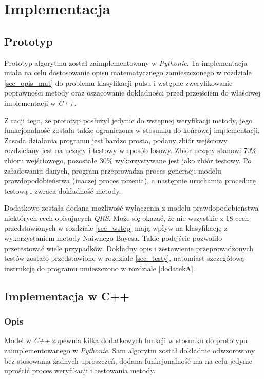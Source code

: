 \section{Implementacja}
\label{sec_implementacja}

\subsection{Prototyp}
\label{subsec_prototyp}

Prototyp algorytmu został zaimplementowany w \textit{Pythonie}. Ta implementacja miała na celu dostosowanie opisu matematycznego zamieszczonego w rozdziale \ref{sec_opis_mat} do problemu klasyfikacji pulsu i wstępne zweryfikowanie poprawności metody oraz oszacowanie dokładności przed przejściem do właściwej implementacji w \textit{C++}.

Z racji tego, że prototyp posłużył jedynie do wstępnej weryfikacji metody, jego funkcjonalność została także ograniczona w stosunku do końcowej implementacji. Zasada działania programu jest bardzo prosta, podany zbiór wejściowy rozdzielany jest na uczący i testowy w sposób losowy. Zbiór uczący stanowi 70\% zbioru wejściowego, pozostałe 30\% wykorzystywane jest jako zbiór testowy. Po załadowaniu danych, program przeprowadza proces generacji modelu prawdopodobieństwa (inaczej proces uczenia), a następnie uruchamia procedurę testową i zwraca dokładność metody.

Dodatkowo została dodana możliwość wyłączenia z modelu prawdopodobieństwa niektórych cech opisujących \textit{QRS}. Może się okazać, że nie wszystkie z 18 cech przedstawionych w rozdziale \ref{sec_wstep} mają wpływ na klasyfikację z wykorzystaniem metody Naiwnego Bayesa. Takie podejście pozwoliło przetestować wiele przypadków. Dokładny opis i zestawienie przeprowadzonych testów zostało przedstawione w rozdziale \ref{sec_testy}, natomiast szczegółową instrukcję do programu umieszczono w rozdziale \ref{dodatekA}.

\subsection{Implementacja w C++}
\label{subsec_implementacja_cpp}

\subsubsection{Opis}
Model w \textit{C++} zapewnia kilka dodatkowych funkcji w stosunku do prototypu zaimplementowanego w \textit{Pythonie}. Sam algorytm został dokładnie odwzorowany bez stosowania żadnych uproszczeń, dodana funkcjonalność ma na celu jedynie uprościć proces weryfikacji i testowania metody. 

